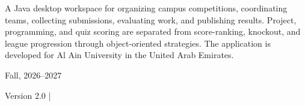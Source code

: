 {\begin{titlepage}
\vspace{0.3cm}
\begin{tcolorbox}[colback=gray!5,colframe=black!70,title=\textbf{Project Summary},fonttitle=\bfseries,width=0.95\textwidth,boxrule=0.4mm,arc=3mm,left=7pt,right=7pt,top=4pt,bottom=4pt]
A Java desktop workspace for organizing campus competitions, coordinating teams, collecting submissions, evaluating work, and publishing results. Project, programming, and quiz scoring are separated from score-ranking, knockout, and league progression through object-oriented strategies. The application is developed for Al Ain University in the United Arab Emirates.
\end{tcolorbox}
\vfill{\normalsize Fall, 2026--2027\par}{\small Version 2.0 \;|\; \reportdate\par}
\end{titlepage}\hypersetup{pageanchor=true}\tableofcontents\clearpage{}}
